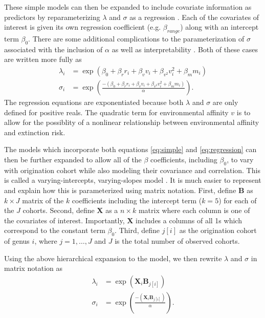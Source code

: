\documentclass[12pt,letterpaper]{article}
\begin{document}
These simple models can then be expanded to include covariate information as predictors by reparameterizing \(\lambda\) and \(\sigma\) as a regression \citep{Klein2003}. Each of the covariates of interest is given its own regression coefficient (e.g. \(\beta_{range}\)) along with an intercept term \(\beta_{0}\). There are some additional complications to the parameterization of \(\sigma\) associated with the inclusion of \(\alpha\) as well as interpretability \citep{Klein2003}. Both of these cases are written more fully as
\begin{equation}
  \begin{aligned}
    \lambda_{i} &= \exp(\beta_{0} + \beta_{r} r_{i} + \beta_{v} v_{i} + \beta_{v^{2}} v_{i}^{2} + \beta_{m} m_{i}) \\
    \sigma_{i} &= \exp\left(\frac{-(\beta_{0} + \beta_{r} r_{i} + \beta_{v} v_{i} + \beta_{v^{2}} v_{i}^{2} + \beta_{m} m_{i})}{\alpha}\right).
  \end{aligned}
  \label{eq:regression}
\end{equation}
The regression equations are exponentiated because both \(\lambda\) and \(\sigma\) are only defined for positive reals. The quadratic term for environmental affinity \(v\) is to allow for the possiblity of a nonlinear relationship between environmental affinity and extinction risk.

The models which incorporate both equations \ref{eq:simple} and \ref{eq:regression} can then be further expanded to allow all of the \(\beta\) coefficients, including \(\beta_{0}\), to vary with origination cohort while also modeling their covariance and correlation. This is called a varying-intercepts, varying-slopes model \citep{Gelman2007}. It is much easier to represent and explain how this is parameterized using matrix notation. First, define \(\mathbf{B}\) as \(k \times J\) matrix of the \(k\) coefficients including the intercept term (\(k = 5\)) for each of the \(J\) cohorts. Second, define \(\mathbf{X}\) as a \(n \times k\) matrix where each column is one of the covariates of interest. Importantly, \(\mathbf{X}\) includes a columns of all 1s which correspond to the constant term \(\beta_{0}\). Third, define \(j[i]\) as the origination cohort of genus \(i\), where \(j = 1, \dots, J\) and \(J\) is the total number of observed cohorts.

Using the above hierarchical expansion to the model, we then rewrite \(\lambda\) and \(\sigma\) in matrix notation as
\begin{equation}
  \begin{aligned}
    \lambda_{i} &= \exp(\mathbf{X}_{i} \mathbf{B}_{j[i]}) \\
    \sigma_{i} &= \exp\left(\frac{-(\mathbf{X}_{i} \mathbf{B}_{j[i]})}{\alpha}\right). 
  \end{aligned}
  \label{eq:multivariate}
\end{equation}
\end{document}

